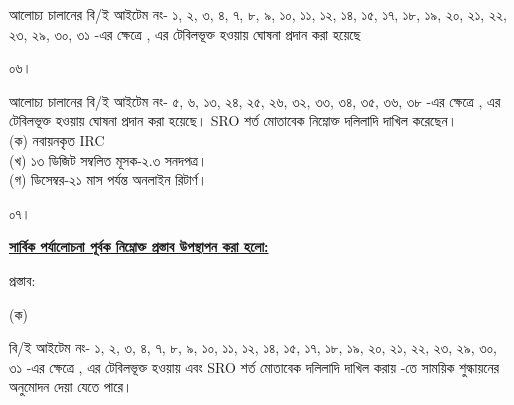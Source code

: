 \documentclass[12pt]{article}
\newcommand{\musokr}{ডিসেম্বর-২১}
\begin{document}
\begin{minipage}[t]{0.95\linewidth}
আলোচ্য চালানের
বি/ই আইটেম নং-
১, ২, ৩, ৪,
৭, ৮, ৯, ১০, ১১, ১২, ১৪,
১৫, ১৭, ১৮, ১৯, ২০, ২১, ২২, ২৩,
২৯, ৩০, ৩১
-এর ক্ষেত্রে
{\srootz}, {\srootzd}
এর টেবিলভূক্ত হওয়ায়
{\cpcofs}
ঘোষনা প্রদান করা হয়েছে
\\
\end{minipage}
\begin{minipage}[t]{0.05\linewidth}
০৬।
\end{minipage}
\begin{minipage}[t]{0.95\linewidth}
আলোচ্য চালানের বি/ই আইটেম নং-
৫, ৬, ১৩, ২৪, ২৫, ২৬,
৩২, ৩৩, ৩৪, ৩৫, ৩৬, ৩৮
-এর ক্ষেত্রে
{\srooot}, {\sroootd}
এর টেবিলভূক্ত হওয়ায়
{\cpcttz}
ঘোষনা প্রদান করা হয়েছে।
SRO শর্ত মোতাবেক নিম্নোক্ত
দলিলাদি দাখিল করেছেন।
\\
(ক) নবায়নকৃত IRC
\\
(খ) ১৩ ডিজিট সম্বলিত মূসক-২.৩ সনদপত্র।
\\
(গ) {\musokr} মাস পর্যন্ত অনলাইন রিটার্ণ।
\\
\end{minipage}
\begin{minipage}[t]{0.05\linewidth}
০৭।
\end{minipage}
\begin{minipage}[t]{0.95\linewidth}
\underline{\textbf{সার্বিক পর্যালোচনা পূর্বক নিম্নোক্ত প্রস্তাব উপস্থাপন করা হলো:}}
\end{minipage}
\begin{minipage}[t]{0.05\linewidth}
\hspace{0em}
\end{minipage}
\begin{minipage}[t]{0.95\linewidth}
প্রস্তাব:
\end{minipage}
\begin{minipage}[t]{0.05\linewidth}
\hspace{1em}
\end{minipage}
\begin{minipage}[t]{0.05\linewidth}
(ক)
\end{minipage}
\begin{minipage}[t]{0.90\linewidth}
বি/ই আইটেম নং-
১, ২, ৩, ৪,
৭, ৮, ৯, ১০, ১১, ১২, ১৪,
১৫, ১৭, ১৮, ১৯, ২০, ২১, ২২, ২৩,
২৯, ৩০, ৩১
-এর ক্ষেত্রে
{\srootz}, {\srootzd}
এর টেবিলভূক্ত হওয়ায়
এবং SRO শর্ত মোতাবেক
দলিলাদি দাখিল করায়
{\cpcofs}
-তে
সাময়িক
শুল্কায়নের অনুমোদন দেয়া
যেতে পারে।
\\
\end{minipage}
\begin{minipage}[t]{0.05\linewidth}
\hspace{1em}
\end{minipage}
\end{document}
